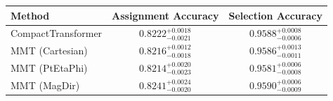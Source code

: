     \begin{tabular}{lcc}
        \toprule
        Method & Assignment Accuracy & Selection Accuracy \\
        \midrule
        CompactTransformer & $0.8222^{+0.0018}_{-0.0021}$ & $0.9588^{+0.0008}_{-0.0006}$ \\
        MMT (Cartesian) & $0.8216^{+0.0012}_{-0.0018}$ & $0.9586^{+0.0013}_{-0.0011}$ \\
        MMT (PtEtaPhi) & $0.8214^{+0.0020}_{-0.0023}$ & $0.9581^{+0.0006}_{-0.0008}$ \\
        MMT (MagDir) & $0.8241^{+0.0024}_{-0.0020}$ & $0.9590^{+0.0006}_{-0.0009}$ \\
        \bottomrule
    \end{tabular}